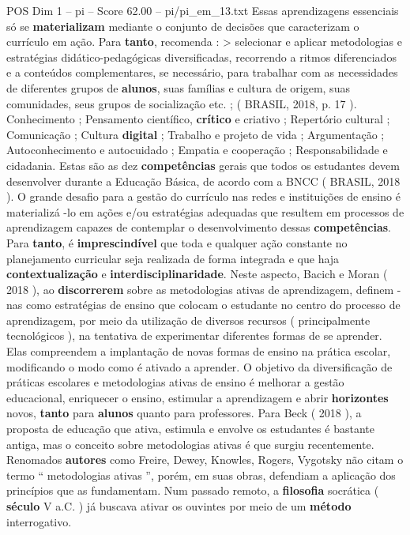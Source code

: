 \begin{textsample}{POS Dim 1 – pi – Score 62.00 – pi/pi\_em\_13.txt}
Essas aprendizagens essenciais só se \textbf{materializam} mediante o conjunto de decisões que caracterizam o currículo em ação.
Para \textbf{tanto}, recomenda : > selecionar e aplicar metodologias e estratégias didático-pedagógicas diversificadas, recorrendo a ritmos diferenciados e a conteúdos complementares, se necessário, para trabalhar com as necessidades de diferentes grupos de \textbf{alunos}, suas famílias e cultura de origem, suas comunidades, seus grupos de socialização etc. ; ( BRASIL, 2018, p. 17 ).
Conhecimento ; Pensamento científico, \textbf{crítico} e criativo ; Repertório cultural ; Comunicação ; Cultura \textbf{digital} ; Trabalho e projeto de vida ; Argumentação ; Autoconhecimento e autocuidado ; Empatia e cooperação ; Responsabilidade e cidadania.
Estas são as dez \textbf{competências} gerais que todos os estudantes devem desenvolver durante a Educação Básica, de acordo com a BNCC ( BRASIL, 2018 ).
O grande desafio para a gestão do currículo nas redes e instituições de ensino é materializá -lo em ações e/ou estratégias adequadas que resultem em processos de aprendizagem capazes de contemplar o desenvolvimento dessas \textbf{competências}.
Para \textbf{tanto}, é \textbf{imprescindível} que toda e qualquer ação constante no planejamento curricular seja realizada de forma integrada e que haja \textbf{contextualização} e \textbf{interdisciplinaridade}.
Neste aspecto, Bacich e Moran ( 2018 ), ao \textbf{discorrerem} sobre as metodologias ativas de aprendizagem, definem -nas como estratégias de ensino que colocam o estudante no centro do processo de aprendizagem, por meio da utilização de diversos recursos ( principalmente tecnológicos ), na tentativa de experimentar diferentes formas de se aprender.
Elas compreendem a implantação de novas formas de ensino na prática escolar, modificando o modo como é ativado a aprender.
O objetivo da diversificação de práticas escolares e metodologias ativas de ensino é melhorar a gestão educacional, enriquecer o ensino, estimular a aprendizagem e abrir \textbf{horizontes} novos, \textbf{tanto} para \textbf{alunos} quanto para professores.
Para Beck ( 2018 ), a proposta de educação que ativa, estimula e envolve os estudantes é bastante antiga, mas o conceito sobre metodologias ativas é que surgiu recentemente.
Renomados \textbf{autores} como Freire, Dewey, Knowles, Rogers, Vygotsky não citam o termo “ metodologias ativas ”, porém, em suas obras, defendiam a aplicação dos princípios que as fundamentam.
Num passado remoto, a \textbf{filosofia} socrática ( \textbf{século} V a.C. ) já buscava ativar os ouvintes por meio de um \textbf{método} interrogativo.

\end{textsample}
